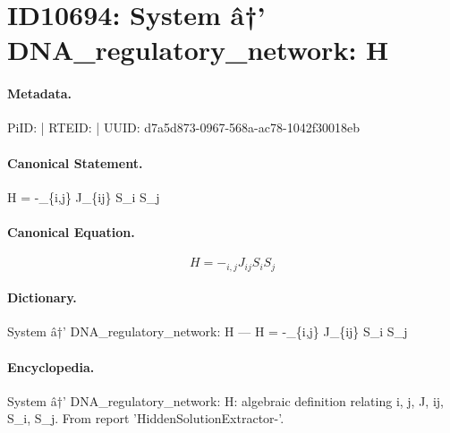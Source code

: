 \section*{ID10694: System â†’ DNA\_regulatory\_network: H}
\paragraph{Metadata.}
PiID:  | RTEID:  | UUID: d7a5d873-0967-568a-ac78-1042f30018eb

\paragraph{Canonical Statement.}
H = -\_\{i,j\} J\_\{ij\} S\_i S\_j

\paragraph{Canonical Equation.}
\[
H = -_{i,j} J_{ij} S_i S_j
\]

\paragraph{Dictionary.}
System â†’ DNA\_regulatory\_network: H — H = -\_\{i,j\} J\_\{ij\} S\_i S\_j

\paragraph{Encyclopedia.}
System â†’ DNA\_regulatory\_network: H: algebraic definition relating i, j, J, ij, S\_i, S\_j. From report 'HiddenSolutionExtractor-'.

